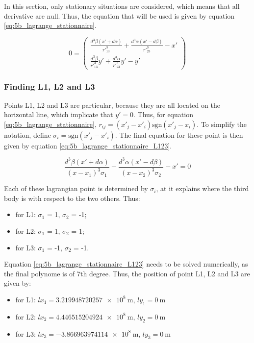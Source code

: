 \documentclass[a4paper,12pt,twoside]{article}
\begin{document}
In this section, only stationary situations are considered, which means that all derivative are null.
Thus, the equation that will be used is given by equation \eqref{eq:5b_lagrange_stationnaire}.

\begin{equation}
  0
  =
  \begin{pmatrix}
    \frac{d^3\beta(x' + d\alpha)}{r'^3_{13}} + \frac{d^3\alpha(x' - d\beta)}{r'^3_{23}} - x'\\
    \frac{d^3\beta}{r'^3_{13}}y' + \frac{d^3\alpha}{r'^3_{23}}y' - y'
  \end{pmatrix}
  \label{eq:5b_lagrange_stationnaire}
\end{equation}

\subsubsection{Finding L1, L2 and L3}
Points L1, L2 and L3 are particular, because they are all located on the horizontal line, which implicate that $y'=0$.
Thus, for equation \eqref{eq:5b_lagrange_stationnaire}, $r_{ij} = (x'_j - x'_i)\text{sgn}\left(x'_j - x_i\right)$.
To simplify the notation, define $\sigma_i = \text{sgn}\left(x'_j - x'_i\right)$.
The final equation for these point is then given by equation \eqref{eq:5b_lagrange_stationnaire_L123}.

\begin{equation}
  \frac{d^3\beta\left(x' + d\alpha\right)}{\left(x-x_1\right)^3\sigma_1} + \frac{d^3\alpha\left(x' - d\beta\right)}{\left(x-x_2\right)^3\sigma_2} - x' = 0
  \label{eq:5b_lagrange_stationnaire_L123}
\end{equation}

Each of these lagrangian point is determined by $\sigma_i$, at it explains where the third body is with respect to the two others.
Thus:
\begin{itemize}
  \item for L1: $\sigma_1$ = 1, $\sigma_2$ = -1;
  \item for L2: $\sigma_1$ = 1, $\sigma_2$ = 1;
  \item for L3: $\sigma_1$ = -1, $\sigma_2$ = -1.
\end{itemize}

Equation \eqref{eq:5b_lagrange_stationnaire_L123} needs to be solved numerically, as the final polynome is of 7th degree.
Thus, the position of point L1, L2 and L3 are given by:
\begin{itemize}
  \item for L1: $lx_1 = \SI{3.219948720257e8}{\m}$, $ly_1 = \SI{0}{\m}$
  \item for L2: $lx_2 = \SI{4.446515204924e8}{\m}$, $ly_2 = \SI{0}{\m}$
  \item for L3: $lx_3 = \SI{-3.866963974114e8}{\m}$, $ly_3 = \SI{0}{\m}$
\end{itemize}
\end{document}
